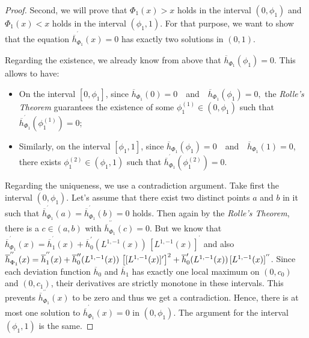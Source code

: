 \documentclass[10pt,a4paper]{amsart}
\begin{document}
\begin{proof}
Second, we will prove that $\Phi _{1}(x)>x$ holds in the interval $(0,\phi
_{1})$ and $\Phi _{1}(x)<x$ holds in the interval $(\phi _{1},1).$ For that
purpose, we want to show that the equation $\overline{h}_{\Phi
_{1}}^{^{\prime }}(x)=0$ has exactly two solutions in $(0,1)$.

Regarding the existence, we already know from above that $\overline{h}_{\Phi
_{1}}(\phi _{1})=0$. This allows to have:

\begin{itemize}
\item On the interval $[0,\phi _{1}]$, since $\overline{h}_{\Phi
_{1}}(0)=0\quad $and$\quad \overline{h}_{\Phi _{1}}(\phi _{1})=0,$ the 
\textit{Rolle's Theorem} guarantees the existence of some $\phi
_{1}^{(1)}\in (0,\phi _{1})$ such that $\overline{h}_{\Phi _{1}}^{^{\prime
}}(\phi _{1}^{(1)})=0;$

\item Similarly, on the interval $[\phi _{1},1]$, since $\overline{h}_{\Phi
_{1}}(\phi _{1})=0\quad $and$\quad \overline{h}_{\Phi _{1}}(1)=0$, there
exists $\phi _{1}^{(2)}\in (\phi _{1},1)$ such that $\overline{h}_{\Phi
_{1}}^{^{\prime }}(\phi _{1}^{(2)})=0.$
\end{itemize}

Regarding the uniqueness, we use a contradiction argument. Take first the
interval $(0,\phi _{1})$. Let's assume that there exist two distinct points $%
a$ and $b$ in it such that $\overline{h}_{\Phi _{1}}^{^{\prime }}(a)=%
\overline{h}_{\Phi _{1}}^{^{\prime }}(b)=0$ holds. Then again by the \textit{%
Rolle's Theorem}, there is a $c\in (a,b)$ with $\overline{h}_{\Phi
_{1}}^{^{\prime \prime }}(c)=0$. But we know that $\overline{h}_{\Phi
_{1}}^{^{\prime }}(x)=\overline{h}_{1}^{^{\prime }}(x)+\overline{h}%
_{0}^{\prime }(L^{1,-1}(x))\,[L^{1,-1}(x)]^{^{\prime }}$ and also $\overline{%
h}_{\Phi _{1}}^{^{\prime \prime }}(x)=\overline{h}_{1}^{^{\prime \prime
}}(x)+\overline{h}_{0}^{\prime \prime }(L^{1,-1}(x))\,\left[
[L^{1,-1}(x)]^{\prime }\right] ^{2}+\overline{h}_{0}^{\prime
}(L^{1,-1}(x))\,[L^{1,-1}(x)]^{^{\prime \prime }}$. Since each deviation
function $\overline{h}_{0}$ and $\overline{h}_{1}$ has exactly one local
maximum on $(0,c_{0})$ and $(0,c_{1})$, their derivatives are strictly
monotone in these intervals. This prevents $\overline{h}_{\Phi
_{1}}^{^{\prime \prime }}(x)$ to be zero and thus we get a contradiction.
Hence, there is at most one solution to $\overline{h}_{\Phi _{1}}^{^{\prime
}}(x)=0$ in $(0,\phi _{1})$. The argument for the interval $(\phi _{1},1)$
is the same.


\end{proof}
\end{document}

